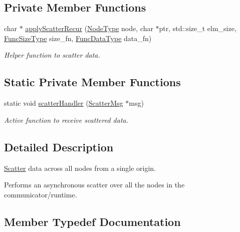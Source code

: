 \subsection*{Private Member Functions}
\begin{DoxyCompactItemize}
\item 
char $\ast$ \hyperlink{structvt_1_1collective_1_1scatter_1_1_scatter_a0e838718a3f3ad28aef779c4ea4a985f}{apply\+Scatter\+Recur} (\hyperlink{namespacevt_a866da9d0efc19c0a1ce79e9e492f47e2}{Node\+Type} node, char $\ast$ptr, std\+::size\+\_\+t elm\+\_\+size, \hyperlink{structvt_1_1collective_1_1scatter_1_1_scatter_a977d895e42999a4078c6705ac851f447}{Func\+Size\+Type} size\+\_\+fn, \hyperlink{structvt_1_1collective_1_1scatter_1_1_scatter_a4040244e8ed36afd5d408c27efceea1b}{Func\+Data\+Type} data\+\_\+fn)
\begin{DoxyCompactList}\small\item\em Helper function to scatter data. \end{DoxyCompactList}\end{DoxyCompactItemize}
\subsection*{Static Private Member Functions}
\begin{DoxyCompactItemize}
\item 
static void \hyperlink{structvt_1_1collective_1_1scatter_1_1_scatter_a96466ab88d5f8e69613c69e0e644e10c}{scatter\+Handler} (\hyperlink{structvt_1_1collective_1_1scatter_1_1_scatter_msg}{Scatter\+Msg} $\ast$msg)
\begin{DoxyCompactList}\small\item\em Active function to receive scattered data. \end{DoxyCompactList}\end{DoxyCompactItemize}


\subsection{Detailed Description}
\hyperlink{structvt_1_1collective_1_1scatter_1_1_scatter}{Scatter} data across all nodes from a single origin. 

Performs an asynchronous scatter over all the nodes in the communicator/runtime. 

\subsection{Member Typedef Documentation}
\mbox{\label{structvt_1_1collective_1_1scatter_1_1_scatter_a4040244e8ed36afd5d408c27efceea1b}} 
